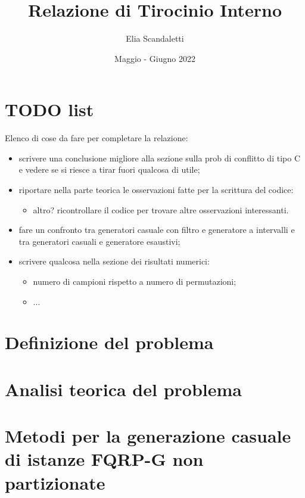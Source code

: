 

\title{Relazione di Tirocinio Interno}
\author{Elia Scandaletti}
\date{Maggio - Giugno 2022}



\maketitle
\tableofcontents

\section*{TODO list}
Elenco di cose da fare per completare la relazione:
\begin{itemize}
    \item scrivere una conclusione migliore alla sezione sulla prob di conflitto di tipo C e vedere se si riesce a tirar fuori qualcosa di utile;
    \item riportare nella parte teorica le osservazioni fatte per la scrittura del codice:
          \begin{itemize}
              \item altro? ricontrollare il codice per trovare altre osservazioni interessanti.
          \end{itemize}
    \item fare un confronto tra generatori casuale con filtro e generatore a intervalli e tra generatori casuali e generatore esaustivi;
    \item scrivere qualcosa nella sezione dei risultati numerici:
          \begin{itemize}
              \item numero di campioni rispetto a numero di permutazioni;
              \item ...
          \end{itemize}
\end{itemize}

\section{Definizione del problema}


\section{Analisi teorica del problema}


\section{Metodi per la generazione casuale di istanze FQRP-G non partizionate}


